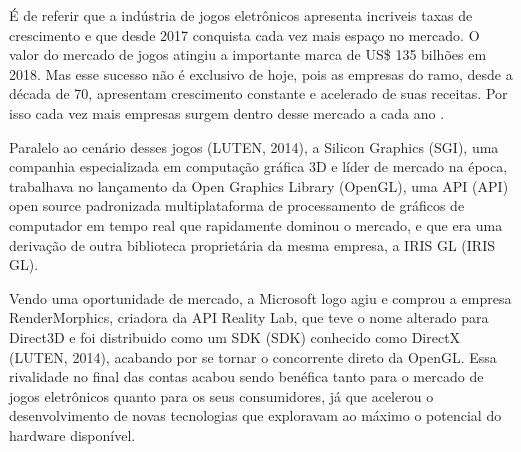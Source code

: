     \begin{figure}[h!]
		\centering
	\end{figure}
	\nocite{figura3}

É de referir que a indústria de jogos eletrônicos apresenta incriveis taxas de crescimento e que desde 2017 conquista cada vez mais espaço no mercado. O valor do mercado de jogos atingiu a importante marca de US\$ 135 bilhões em 2018. Mas esse sucesso não é exclusivo de hoje, pois as empresas do ramo, desde a década de 70, apresentam crescimento constante e acelerado de suas receitas. Por isso cada vez mais empresas surgem dentro desse mercado a cada ano \cite{comparacaoDesempenho2}. 
	
Paralelo ao cenário desses jogos (LUTEN, 2014)\nocite{openGLBook}, a Silicon Graphics (\acrshort{SGI}), uma companhia especializada em computação gráfica 3D e líder de mercado na época, trabalhava no lançamento da Open Graphics Library (\acrshort{OpenGL}), uma API (\acrlong{API}) open source padronizada multiplataforma de processamento de gráficos de computador em tempo real que rapidamente dominou o mercado, e que era uma derivação de outra biblioteca proprietária da mesma empresa, a IRIS GL (\acrlong{IRIS GL}). 

Vendo uma oportunidade de mercado, a Microsoft logo agiu e comprou a empresa RenderMorphics, criadora da \acrshort{API} Reality Lab, que teve o nome alterado para Direct3D e foi distribuido como um SDK (\acrlong{SDK}) conhecido como DirectX (LUTEN, 2014)\nocite{openGLBook}, acabando por se tornar o concorrente direto da \acrshort{OpenGL}. Essa rivalidade no final das contas acabou sendo benéfica tanto para o mercado de jogos eletrônicos quanto para os seus consumidores, já que acelerou o desenvolvimento de novas tecnologias que exploravam ao máximo o potencial do hardware disponível.
	
